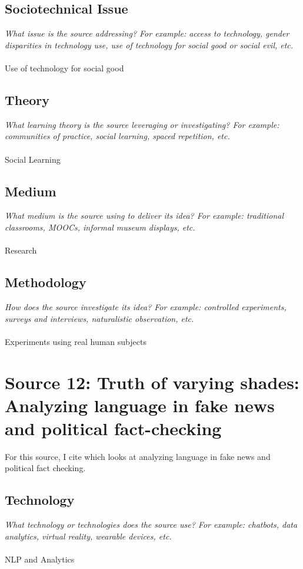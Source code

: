 \documentclass[12pt, final]{article}
\begin{document}
\subsection{Sociotechnical Issue}
\textit{What issue is the source addressing? For example: access to technology, gender disparities in technology use, use of technology for social good or social evil, etc.}
\\
\\
Use of technology for social good

\subsection{Theory}
\textit{What learning theory is the source leveraging or investigating? For example: communities of practice, social learning, spaced repetition, etc.}
\\
\\
Social Learning

\subsection{Medium}
\textit{What medium is the source using to deliver its idea? For example: traditional classrooms, MOOCs, informal museum displays, etc.}
\\
\\
Research

\subsection{Methodology}
\textit{How does the source investigate its idea? For example: controlled experiments, surveys and interviews, naturalistic observation, etc.}
\\
\\
Experiments using real human subjects

\section{Source 12: Truth of varying shades: Analyzing language in fake news and political fact-checking}
\label{Source 12}

For this source, I cite \cite{Rashkin} which looks at analyzing language in fake news and political fact checking.

\subsection{Technology}
\textit{What technology or technologies does the source use? For example: chatbots, data analytics, virtual reality, wearable devices, etc.}
\\
\\
NLP and Analytics
\end{document}
